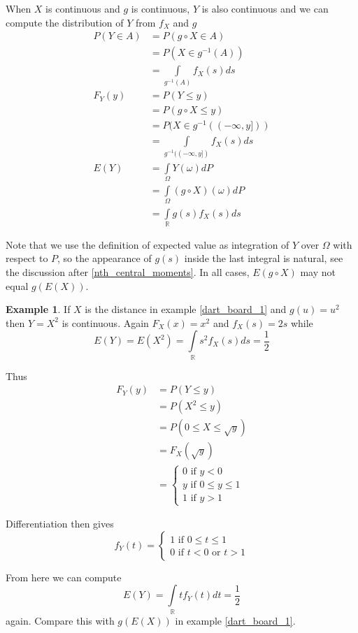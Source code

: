 \documentclass[12pt]{amsart}
\theoremstyle{definition}
\newtheorem{example}[theorem]{Example}
\begin{document}
When $X$ is continuous and $g$ is continuous, $Y$ is also continuous and we can compute the distribution of $Y$ from $f_X$ and $g$
\begin{align*}
P(Y \in A) & = P(g \circ X \in A) \\
 & = P(X \in g^{-1}(A)) \\
 & = \int\limits_{g^{-1}(A)} f_X(s)ds \\
F_Y(y) & = P(Y \leq y) \\
 & = P(g \circ X \leq y) \\
 & = P(X \in g^{-1}((-\infty, y])) \\
 & = \int\limits_{g^{-1}((-\infty, y])} f_X(s)ds \\
E(Y) & = \int\limits_{\Omega}Y(\omega)dP \\
 & = \int\limits_{\Omega} (g \circ X)(\omega)dP \\
 & = \int\limits_{\mathbb{R}}g(s)f_X(s)ds
\end{align*}

Note that we use the definition of expected value as integration of $Y$ over $\Omega$ with respect to $P$, so the appearance of $g(s)$ inside the last integral is natural, see the discussion after \ref{nth_central_moments}. In all cases, $E(g \circ X)$ may not equal $g(E(X))$.

\begin{example} \label{dart_board_2}
If $X$ is the distance in example \ref{dart_board_1} and $g(u) = u^2$ then $Y = X^2$ is continuous. Again $F_X(x) = x^2$ and $f_X(s) = 2s$ while
$$E(Y) = E(X^2) = \int\limits_{\mathbb{R}} s^2f_X(s)ds = \frac{1}{2}$$

Thus
\begin{align*}
F_Y(y) & = P(Y \leq y) \\
 & = P(X^2 \leq y) \\
 & = P(0 \leq X \leq \sqrt{y}) \\
 & = F_X(\sqrt{y}) \\
 & = \begin{cases} 0 \text{ if } y < 0 \\ y \text{ if } 0 \leq y \leq 1 \\ 1 \text{ if } y > 1 \end{cases}
\end{align*}

Differentiation then gives
$$f_Y(t) = \begin{cases} 1 \text{ if } 0 \leq t \leq 1 \\ 0 \text{ if } t < 0 \text{ or } t > 1 \end{cases}$$

From here we can compute
$$E(Y) = \int\limits_{\mathbb{R}} t f_Y(t) dt = \frac{1}{2}$$
again. Compare this with $g(E(X))$ in example \ref{dart_board_1}.
\end{example}
\end{document}
